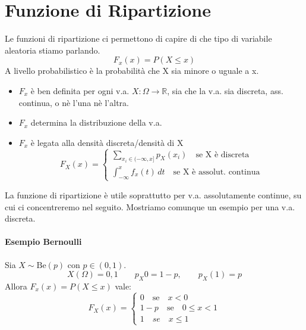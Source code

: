 	\section{Funzione di Ripartizione}
	Le funzioni di ripartizione ci permettono di capire di che tipo di variabile aleatoria
	stiamo parlando.
	\begin{equation*}
		F_x (x) = P(X \leq x)
	\end{equation*}
	A livello probabilistico è la probabilità che X sia minore o uguale a x.
	\begin{itemize}
		\item $F_x$ è ben definita per ogni v.a. $X: \Omega \rightarrow \mathbb{R}$, sia che la v.a.
		      sia discreta, ass. continua, o nè l'una nè l'altra.
		\item $F_x$ determina la distribuzione della v.a.
		\item $F_x$ è legata alla densità discreta/densità di X
		      \begin{equation*}
			      F_X(x) =
			      \begin{cases}
				      \sum_{x_i \in (- \infty, x]} p_X (x_i) \quad \text{se X è discreta} \\
				      \int_{-\infty}^{x} f_x(t)\,dt \quad \text{se X è assolut. continua}
			      \end{cases}
		      \end{equation*}
	\end{itemize}
	La funzione di ripartizione è utile soprattutto per v.a. assolutamente continue, su cui
	ci concentreremo nel seguito. Mostriamo comunque un esempio per una v.a. discreta.
	\paragraph*{Esempio Bernoulli} Sia $X \sim \text{Be}(p)$ con $p \in (0,1)$.
	\begin{equation*}
		X(\Omega) = {0, 1} \qquad p_X{0}=1-p, \qquad p_X(1) = p
	\end{equation*}
	Allora $F_x(x) = P(X \leq x)$ vale:
	\begin{equation*}
		F_X(x) =
		\begin{cases}
			0 \quad \text{se} \quad x < 0          \\
			1-p \quad \text{se} \quad 0 \leq x < 1 \\
			1 \quad se \quad x \leq 1
		\end{cases}
	\end{equation*}

